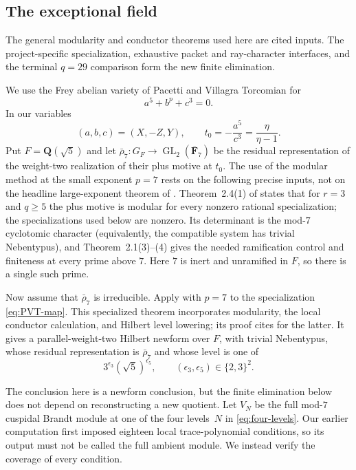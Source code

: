 \documentclass[11pt]{article}
\newcommand{\Q}{\mathbf Q}
\newcommand{\F}{\mathbf F}
\theoremstyle{definition}
\theoremstyle{remark}
\begin{document}
\subsection{The exceptional field}

The general modularity and conductor theorems used here are cited inputs.
The project-specific specialization, exhaustive packet and ray-character
interfaces, and the terminal $q=29$ comparison form the new finite
elimination.

We use the Frey abelian variety of Pacetti and Villagra Torcomian
\cite{PVT} for
\begin{equation}\label{eq:PVT-equation}
                             a^5+b^p+c^3=0.
\end{equation}
In our variables
\begin{equation}\label{eq:PVT-map}
                (a,b,c)=(X,-Z,Y),\qquad
                t_0=-\frac{a^5}{c^3}=\frac{\eta}{\eta-1}.
\end{equation}
Put $F=\Q(\sqrt5)$ and let
\(\bar\rho_7:G_F\to\operatorname{GL}_2(\overline{\F}_7)\) be the residual
representation of the weight-two realization of their plus motive at $t_0$.  The use of the modular
method at the small exponent $p=7$ rests on the following precise inputs,
not on the headline large-exponent theorem of \cite{PVT}.
Theorem~2.4(1) of \cite{PVT} states that for $r=3$ and $q\geq5$ the plus
motive is modular for every nonzero rational specialization; the
specializations used below are nonzero.  Its determinant is
the mod-$7$ cyclotomic character (equivalently, the compatible system has
trivial Nebentypus), and Theorem~2.1(3)--(4) gives the needed ramification
control and finiteness at every prime above $7$.  Here $7$ is inert and
unramified in $F$, so there is a single such prime.

Now assume that $\bar\rho_7$ is irreducible.  Apply
\cite[Theorem~7.8]{PVT} with $p=7$ to the specialization
\eqref{eq:PVT-map}.  This specialized theorem incorporates modularity,
the local conductor calculation, and Hilbert level lowering; its proof
cites \cite{BreuilDiamond} for the latter.  It gives a parallel-weight-two
Hilbert newform over $F$, with trivial Nebentypus,
whose residual representation is $\bar\rho_7$ and whose level is one of
\begin{equation}\label{eq:four-levels}
 3^{\epsilon_3}(\sqrt5)^{\epsilon_5},\qquad
 (\epsilon_3,\epsilon_5)\in\{2,3\}^2.
\end{equation}

The conclusion here is a newform conclusion, but the finite elimination below
does not depend on reconstructing a new quotient.  Let $V_N$ be the full
mod-$7$ cuspidal Brandt module at one of the four levels~$N$ in
\eqref{eq:four-levels}.  Our earlier computation first imposed eighteen
local trace-polynomial conditions, so its output must not be called the full
ambient module.  We instead verify the coverage of every condition.
\end{document}
